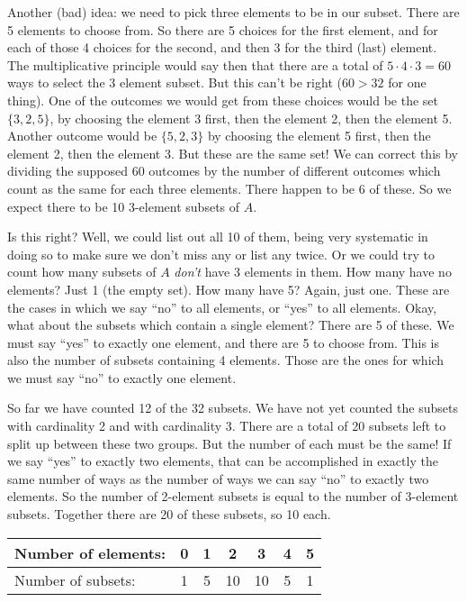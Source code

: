 \documentclass[12pt]{article}
\begin{document}
Another (bad) idea: we need to pick three elements to be in our subset.  There are 5 elements to choose from.  So there are 5 choices for the first element, and for each of those 4 choices for the second, and then 3 for the third (last) element.  The multiplicative principle would say then that there are a total of $5 \cdot 4 \cdot 3 = 60$ ways to select the 3 element subset.  But this can't be right ($60 > 32$ for one thing).  One of the outcomes we would get from these choices would be the set $\{3,2,5\}$, by choosing the element 3 first, then the element 2, then the element 5.  Another outcome would be $\{5,2,3\}$ by choosing the element 5 first, then the element 2, then the element 3.  But these are the same set!  We can correct this by dividing the supposed 60 outcomes by the number of different outcomes which count as the same for each three elements. There happen to be 6 of these.  So we expect there to be 10 3-element subsets of $A$.

Is this right?  Well, we could list out all 10 of them, being very systematic in doing so to make sure we don't miss any or list any twice.  Or we could try to count how many subsets of $A$ {\em don't} have 3 elements in them.  How many have no elements?  Just 1 (the empty set).  How many have 5?  Again, just one.  These are the cases in which we say ``no'' to all elements, or ``yes'' to all elements.  Okay, what about the subsets which contain a single element?  There are 5 of these.  We must say ``yes'' to exactly one element, and there are 5 to choose from.  This is also the number of subsets containing 4 elements.  Those are the ones for which we must say ``no'' to exactly one element.  

So far we have counted 12 of the 32 subsets.  We have not yet counted the subsets with cardinality 2 and with cardinality 3.  There are a total of 20 subsets left to split up between these two groups.  But the number of each must be the same!  If we say ``yes'' to exactly two elements, that can be accomplished in exactly the same number of ways as the number of ways we can say ``no'' to exactly two elements.  So the number of 2-element subsets is equal to the number of 3-element subsets.  Together there are 20 of these subsets, so 10 each.

\begin{center}
\begin{tabular}{l|c|c|c|c|c|c}
  Number of elements: & 0 & 1 & 2 & 3 & 4 & 5 \\ \hline
  Number of subsets: & 1 & 5 & 10 & 10 & 5 & 1
\end{tabular}
\end{center}
\end{document}
